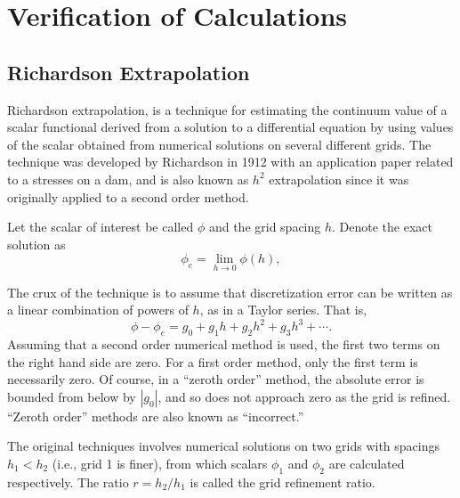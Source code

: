 \section{Verification of Calculations}
\subsection{Richardson Extrapolation}
Richardson extrapolation, is a technique for estimating the continuum value of a scalar functional derived from a solution to a differential equation by using values of the scalar obtained from numerical solutions on several different grids.
The technique was developed by Richardson in 1912 with an application paper related to a stresses on a dam, and is also known as $h^2$ extrapolation since it was originally applied to a second order method.

Let the scalar of interest be called $\phi$ and the grid spacing $h$.
Denote the exact solution as
\begin{equation}
  \phi_e = \lim_{h \to 0} \phi(h),
\end{equation}

The crux of the technique is to assume that discretization error can be written as a linear combination of powers of $h$, as in a Taylor series.
That is,
\begin{equation}
  \phi - \phi_e = g_0 + g_1 h + g_2 h^2 + g_3 h^3 + \cdots.
\end{equation}
Assuming that a second order numerical method is used, the first two terms on the right hand side are zero.
For a first order method, only the first term is necessarily zero.
Of course, in a ``zeroth order'' method, the absolute error is bounded from below by $|g_0|$, and so does not approach zero as the grid is refined.
``Zeroth order'' methods are also known as ``incorrect.''

The original techniques involves numerical solutions on two grids with spacings $h_1 < h_2$ (i.e., grid 1 is finer), from which scalars $\phi_1$ and $\phi_2$ are calculated respectively.
The ratio $r = h_2/h_1$ is called the grid refinement ratio.

